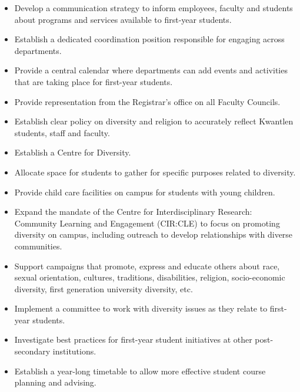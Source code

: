 \documentclass[11pt, letterpaper]{article}
\begin{document}
\begin{itemize}
\item
  Develop a communication strategy to inform employees, faculty and
  students about programs and services available to first-year students.
\item
  Establish a dedicated coordination position responsible for engaging
  across departments.
\item
  Provide a central calendar where departments can add events and
  activities that are taking place for first-year students.
\item
  Provide representation from the Registrar's office on all Faculty
  Councils.
\item
  Establish clear policy on diversity and religion to accurately reflect
  Kwantlen students, staff and faculty.
\item
  Establish a Centre for Diversity.
\item
  Allocate space for students to gather for specific purposes related to
  diversity.
\item
  Provide child care facilities on campus for students with young
  children.
\item
  Expand the mandate of the Centre for Interdisciplinary Research:
  Community Learning and Engagement (CIR:CLE) to focus on promoting
  diversity on campus, including outreach to develop relationships with
  diverse communities.
\item
  Support campaigns that promote, express and educate others about race,
  sexual orientation, cultures, traditions, disabilities, religion,
  socio-economic diversity, first generation university diversity, etc.
\item
  Implement a committee to work with diversity issues as they relate to
  first-year students.
\item
  Investigate best practices for first-year student initiatives at other
  post-secondary institutions.
\item
  Establish a year-long timetable to allow more effective student course
  planning and advising.
\end{itemize}
\end{document}
